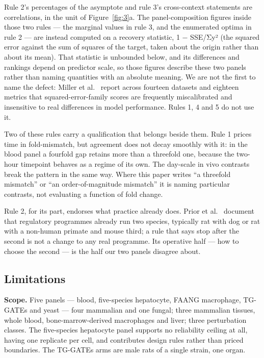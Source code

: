 \documentclass[11pt,a4paper]{article}
\begin{document}
Rule 2's percentages of the asymptote and rule 3's cross-context
statements are correlations, in the unit of Figure~\ref{fig:3}a. The
panel-composition figures inside those two rules --- the marginal values
in rule 3, and the enumerated optima in rule 2 --- are instead computed
on a recovery statistic, 1 − SSE/Σy² (the squared error against the sum
of squares of the target, taken about the origin rather than about its
mean). That statistic is unbounded below, and its differences and
rankings depend on predictor scale, so those figures describe these two
panels rather than naming quantities with an absolute meaning. We are
not the first to name the defect: Miller et al.~\cite{ref53} report across
fourteen datasets and eighteen metrics that squared-error-family scores
are frequently miscalibrated and insensitive to real differences in
model performance. Rules 1, 4 and 5 do not use it.

Two of these rules carry a qualification that belongs beside them. Rule
1 prices time in fold-mismatch, but agreement does not decay smoothly
with it: in the blood panel a fourfold gap retains more than a threefold
one, because the two-hour timepoint behaves as a regime of its own. The
day-scale in vivo contrasts break the pattern in the same way. Where
this paper writes ``a threefold mismatch'' or ``an order-of-magnitude
mismatch'' it is naming particular contrasts, not evaluating a function
of fold change.

Rule 2, for its part, endorses what practice already does. Prior et
al.~\cite{ref23} document that regulatory programmes already run two
species, typically rat with dog or rat with a non-human primate and
mouse third; a rule that says stop after the second is not a change to
any real programme. Its operative half --- how to choose the second ---
is the half our two panels disagree about.

\subsection{Limitations}\label{limitations}

\textbf{Scope.} Five panels --- blood, five-species hepatocyte, FAANG
macrophage, TG-GATEs and yeast --- four mammalian and one fungal; three
mammalian tissues, whole blood, bone-marrow-derived macrophages and
liver; three perturbation classes. The five-species hepatocyte panel
supports no reliability ceiling at all, having one replicate per cell,
and contributes design rules rather than priced boundaries. The TG-GATEs
arms are male rats of a single strain, one organ.
\end{document}
